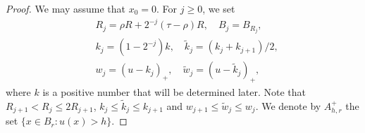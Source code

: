 \documentclass[11pt]{amsart}
\theoremstyle{plain}
\theoremstyle{definition}
\numberwithin{equation}{section}
\begin{document}
\begin{proof}
We may assume that $x_0=0$. For $j \geq 0$, we set
\begin{equation*}
\begin{split}
&R_j = \rho R+2^{-j}(\tau-\rho)R, \quad B_j = B_{R_j}, \\
&k_j = (1-2^{-j})k, \quad \tilde{k}_j = (k_j + k_{j+1})/2, \\
&w_j = (u-k_j)_+, \quad \tilde{w}_j = (u-\tilde{k}_j)_+,
\end{split}
\end{equation*}
where $k$ is a positive number that will be determined later. Note that $R_{j+1} < R_j \leq 2R_{j+1}$, $k_j \leq \tilde{k}_j \leq k_{j+1}$ and $w_{j+1} \leq \tilde{w}_j \leq w_j$. We denote by $A^+_{h, r}$ the set $\lbrace x \in B_r: u(x) > h \rbrace$.


\end{proof}
\end{document}
